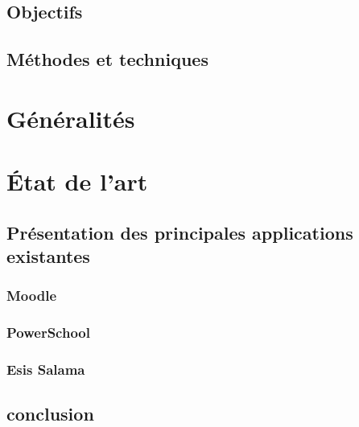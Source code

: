 \documentclass[12pt, a4paper]{report}
\begin{document}
    \section{Objectifs}\label{sec:objectifs}
    

    \section{Méthodes et techniques}\label{sec:methode}
    

    \chapter{Généralités}\label{cha:generalites}
    
    
    \chapter{État de l'art}\label{cha:etat-de-l-art}
    

    \section{Présentation des principales applications existantes}\label{sec:definitions-et-concepts-cles}
    

    \subsection{Moodle}\label{subsec:moodle}
    

    \subsection{PowerSchool}\label{subsec:powerschool}
    

    \subsection{Esis Salama}\label{subsec:esis-salamae}
    

    \section{conclusion}\label{sec:conclusion}
    
\end{document}
